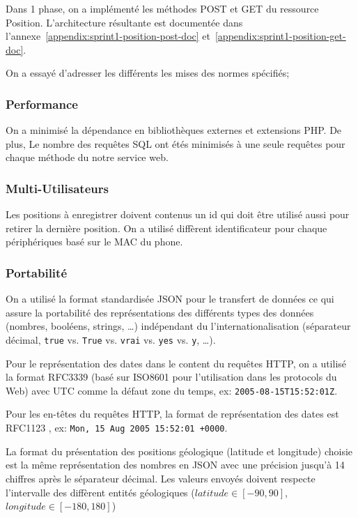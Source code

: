 Dans 1\ier{} phase, on a implémenté les méthodes POST et GET du ressource
Position. L'architecture résultante est documentée dans
l'annexe~\ref{appendix:sprint1-position-post-doc}
et~\ref{appendix:sprint1-position-get-doc}.

On a essayé d'adresser les différents les mises des normes spécifiés;

\subsubsection{Performance}

On a minimisé la dépendance en bibliothèques externes et extensions PHP\@. De
plus, Le nombre des requêtes SQL ont étés minimisés à une seule requêtes pour
chaque méthode du notre service web.

\subsubsection{Multi-Utilisateurs}

Les positions à enregistrer doivent contenus un id qui doit être utilisé aussi
pour retirer la dernière position. On a utilisé diffèrent identificateur pour
chaque périphériques basé sur le MAC du phone.

\subsubsection{Portabilité}

On a utilisé la format standardisée JSON pour le transfert de données ce qui
assure la portabilité des représentations des différents types des données
(nombres, booléens, strings, \ldots) indépendant du l'internationalisation
(séparateur décimal, \verb|true| vs. \verb|True| vs. \verb|vrai| vs. \verb|yes|
vs. \verb|y|, \ldots).

Pour le représentation des dates dans le content du requêtes HTTP, on a utilisé
la format RFC3339 \cite{RFC3339} (basé sur ISO8601 \cite{ISO8601} pour
l'utilisation dans les protocols du Web) avec UTC comme la défaut zone du
temps, ex: \verb|2005-08-15T15:52:01Z|.

Pour les en-têtes du requêtes HTTP, la format de représentation des dates est
RFC1123 \cite{RFC1123}, ex: \verb|Mon, 15 Aug 2005 15:52:01 +0000|.

La format du présentation des positions géologique (latitude et longitude)
choisie est la même représentation des nombres en JSON avec une précision
jusqu'à 14 chiffres après le séparateur décimal. Les valeurs envoyés doivent
respecte l'intervalle des diffèrent entités géologiques ($latitude \in [-90,
90]$, $longitude \in [-180, 180]$)

